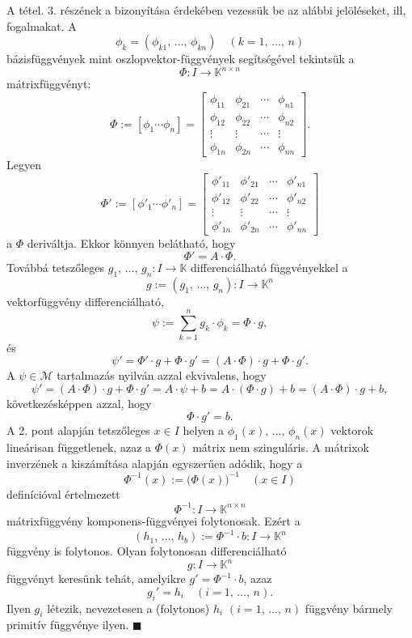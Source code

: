 \documentclass{article}
\newcommand{\K}{\mathbb{K}}
\begin{document}
	A tétel. 3. részének a bizonyítása érdekében vezessük be az alábbi jelöléseket, ill, fogalmakat. A
	\[
		\phi_k = (\phi_{k1}, \, \dots, \, \phi_{kn}) \quad (k=1, \, \dots, \, n)
	\]
	bázisfüggvények mint oszlopvektor-függvények segítségével tekintsük a
	\[
		\Phi : I \to \K^{n \times n}
	\]
	mátrixfüggvényt:
	\[
		\Phi := [\phi_1 \cdots \phi_n] = \begin{bmatrix}
			\phi_{11} & \phi_{21} & \cdots & \phi_{n1} \\
			\phi_{12} & \phi_{22} & \cdots & \phi_{n2} \\
			\vdots & \vdots & \cdots & \vdots \\
			\phi_{1n} & \phi_{2n} & \cdots & \phi_{nn}
		\end{bmatrix}.
	\]
	Legyen
	\[
		\Phi' := [\phi'_1 \cdots \phi'_n] = \begin{bmatrix}
			\phi'_{11} & \phi'_{21} & \cdots & \phi'_{n1} \\
			\phi'_{12} & \phi'_{22} & \cdots & \phi'_{n2} \\
			\vdots & \vdots & \cdots & \vdots \\
			\phi'_{1n} & \phi'_{2n} & \cdots & \phi'_{nn}
		\end{bmatrix}
	\]
	a $\Phi$ deriváltja. Ekkor könnyen belátható, hogy
	\[
		\Phi' = A \cdot \Phi.
	\]
	Továbbá tetszőleges $g_1, \, \dots, \, g_n : I \to \K$ differenciálható függvényekkel a
	\[
		g := (g_1, \, \dots, \, g_n) : I \to \K^n
	\]
	vektorfüggvény differenciálható,
	\[
		\psi := \sum_{k=1}^n g_k \cdot \phi_k = \Phi \cdot g,
	\]
	és
	\[
		\psi' = \Phi' \cdot g + \Phi \cdot g' = (A \cdot \Phi) \cdot g + \Phi \cdot g'.
	\]
	A $\psi \in \mathcal{M}$ tartalmazás nyilván azzal ekvivalens, hogy
	\[
		\psi' = (A \cdot \Phi) \cdot g + \Phi \cdot g' = A \cdot \psi + b = A \cdot (\Phi \cdot g) + b = (A \cdot \Phi) \cdot g + b,
	\]
	következésképpen azzal, hogy
	\[
		\Phi \cdot g' = b.
	\]
	A 2. pont alapján tetszőleges $x \in I$ helyen a $\phi_1(x), \, \dots, \, \phi_n(x)$ vektorok lineárisan függetlenek, azaz a $\Phi(x)$ mátrix nem szinguláris. A mátrixok inverzének a kiszámítása alapján egyszerűen adódik, hogy a
	\[
		\Phi^{-1}(x) := \big( \Phi(x) \big)^{-1} \quad (x \in I)
	\]
	definícióval értelmezett
	\[
		\Phi^{-1} : I \to \K^{n\times n}
	\]
	mátrixfüggvény komponens-függvényei folytonosak. Ezért a
	\[
		(h_1, \, \dots, \, h_b) := \Phi^{-1} \cdot b : I \to \K^n
	\]
	függvény is folytonos. Olyan folytonosan differenciálható
	\[
		g : I \to \K^n
	\]
	függvényt keresünk tehát, amelyikre $g' = \Phi^{-1} \cdot b$, azaz
	\[
		g_i' = h_i \quad (i = 1, \, \dots, \, n).
	\]
	Ilyen $g_i$ létezik, nevezetesen a (folytonos) $h_i$ $(i = 1, \, \dots, \, n)$ függvény bármely primitív függvénye ilyen. $\blacksquare$\\
	
\end{document}
